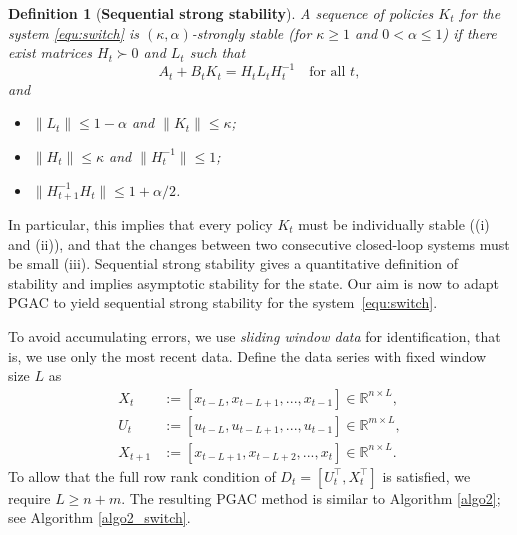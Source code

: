 \documentclass[letterpaper, 10 pt, conference]{ieeeconf}  %
\newtheorem{definition}{Definition}
\begin{document}

\begin{definition}[\textbf{Sequential strong stability}] A sequence of policies \( K_t \) for the system \eqref{equ:switch} is \( (\kappa, \alpha) \)-strongly stable (for \( \kappa \geq 1 \) and \( 0 < \alpha \leq 1 \)) if there exist matrices \( H_t \succ 0 \) and \( L_t \) such that
\[A_t + B_t K_t = H_t L_t H_t^{-1} \quad \text{for all } t,\]
and
\begin{itemize}
  \item[(i)] \( \|L_t\| \leq 1 - \alpha \) and \( \|K_t\| \leq \kappa \);
  \item[(ii)] \( \|H_t\| \leq \kappa \) and \( \|H_t^{-1}\| \leq 1 \);
  \item[(iii)] \( \|H_{t+1}^{-1} H_t\| \leq 1 + \alpha/2 \).
\end{itemize} 
\label{def:sss}
\end{definition}  

In particular, this implies that every policy $K_t$ must be individually stable ((i) and (ii)), and that the changes between two consecutive closed-loop systems must be small (iii). Sequential strong stability gives a quantitative definition of stability and implies asymptotic stability for the state. Our aim is now to adapt PGAC to yield sequential strong stability for the system~\eqref{equ:switch}. 

To avoid accumulating errors, we use \textit{sliding window data} for identification, that is, we use only the most recent data. Define the data series with fixed window size $L$ as 
\begin{equation}\label{equ:swd}
    \begin{aligned}
        X_t &:= [x_{t-L}, x_{t-L+1}, ...,x_{t-1}] \in \mathbb{R}^{n\times L}, \\
        U_t &:= [u_{t-L}, u_{t-L+1}, ...,u_{t-1}] \in \mathbb{R}^{m\times L}, \\
        X_{t+1} &:= [x_{t-L+1}, x_{t-L+2}, ...,x_{t}] \in \mathbb{R}^{n\times L}.
    \end{aligned}
\end{equation}
To allow that the full row rank condition of $D_t = [U_t^{\top}, X_t^{\top}]$ is satisfied, we require \(L \geq n+m\). The resulting PGAC method is similar to Algorithm \ref{algo2}; see Algorithm \ref{algo2_switch}.
\end{document}
